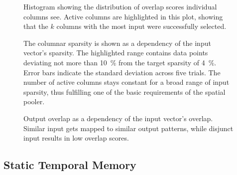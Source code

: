 \begin{figure}
	\begin{center}
		
	\end{center}
	\caption{Histogram showing the distribution of overlap scores individual columns see. Active columns are highlighted in this plot, showing that the $k$ columns with the most input were successfully selected.} 
	\label{fig:spatial_pooler_activity}
\end{figure}

\begin{figure}
	\begin{center}
		
	\end{center}
	\caption{The columnar sparsity is shown as a dependency of the input vector's sparsity. The highlighted range contains data points deviating not more than \SI{10}{\%} from the target sparsity of \SI{4}{\%}. Error bars indicate the standard deviation across five trials. The number of active columns stays constant for a broad range of input sparsity, thus fulfilling one of the basic requirements of the spatial pooler.} 
	\label{fig:spatial_pooler_sparsity}
\end{figure}

\begin{figure}
	\begin{center}
		
	\end{center}
	\caption{Output overlap as a dependency of the input vector's overlap. Similar input gets mapped to similar output patterns, while disjunct input results in low overlap scores.} 
	\label{fig:spatial_pooler_overlap}
\end{figure}

\subsection{Static Temporal Memory}

